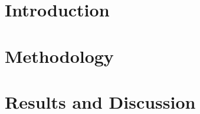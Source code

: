 \documentclass[11pt,a4paper]{article}
\begin{document}



\section{Introduction}

\section{Methodology}

\section{Results and Discussion}
\end{document}
